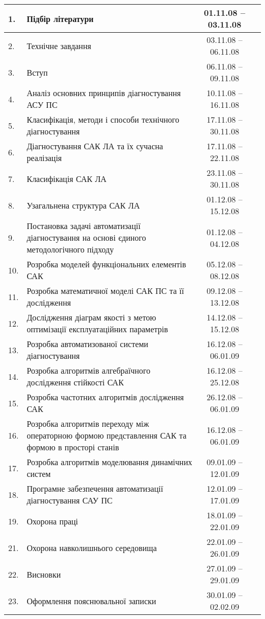 \documentclass[ukrainian,utf8]{eskdtext}
\begin{document}
\begin{longtable}{|l|p{8.5cm}|c|c|}
\hline
1. & Підбір літератури & 01.11.08 -- 03.11.08 & \\ \hline
2. & Технічне завдання & 03.11.08 -- 06.11.08 & \\ \hline
3. & Вступ & 06.11.08 -- 09.11.08 & \\ \hline
4. & Аналіз основних принципів діагностування АСУ ПС & 10.11.08 -- 16.11.08 & \\ \hline
5. & Класифікація, методи і способи технічного діагностування & 17.11.08 -- 30.11.08 & \\ \hline
6. & Діагностування САК ЛА та їх сучасна реалізація & 17.11.08 -- 22.11.08 & \\ \hline
7. & Класифікація САК ЛА & 23.11.08 -- 30.11.08 & \\ \hline
8. & Узагальнена структура САК ЛА & 01.12.08 -- 15.12.08 & \\ \hline
9. & Постановка задачі автоматизації діагностування на основі єдиного методологічного підходу & 01.12.08 -- 04.12.08 & \\ \hline
10. & Розробка моделей функціональних елементів САК & 05.12.08 -- 08.12.08 & \\ \hline
11. & Розробка математичної моделі САК ПС та її дослідження & 09.12.08 -- 13.12.08 & \\ \hline
12. & Дослідження діаграм якості з метою оптимізації експлуатаційних параметрів & 14.12.08 -- 15.12.08 & \\ \hline
13. & Розробка автоматизованої системи діагностування & 16.12.08 -- 06.01.09 & \\ \hline
14. & Розробка алгоритмів алгебраїчного дослідження стійкості САК &16.12.08 -- 25.12.08 & \\ \hline
15. & Розробка частотних алгоритмів дослідження САК & 26.12.08 -- 06.01.09 & \\ \hline
16. & Розробка алгоритмів переходу між операторною формою представлення САК та формою в просторі станів & 16.12.08 -- 06.01.09 & \\ \hline
17. & Розробка алгоритмів моделювання динамічних систем & 09.01.09 -- 12.01.09 & \\ \hline
18. & Програмне забезпечення автоматизації діагностування САУ ПС & 12.01.09 -- 17.01.09 & \\ \hline
19. & Охорона праці & 18.01.09 -- 22.01.09 & \\ \hline
21. & Охорона навколишнього середовища & 22.01.09 -- 26.01.09 & \\ \hline
22. & Висновки & 27.01.09 -- 29.01.09 & \\ \hline
23. & Оформлення пояснювальної записки & 30.01.09 -- 02.02.09 & \\ \hline
\end{longtable}
\end{document}
